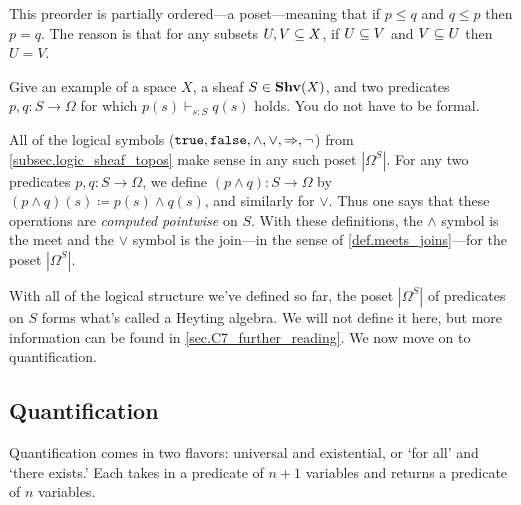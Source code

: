 \documentclass[7Sketches]{subfiles}
\begin{document}
This preorder is partially ordered---a poset---meaning that if $p\leq q$ and $q\leq p$ then $p=q$. The reason is that for any subsets $U,V\ss X$, if $U\ss V$ and $V\ss U$ then $U=V$.

\begin{exercise}%
\label{exc.vdash}
Give an example of a space $X$, a sheaf $S\in\Shv(X)$, and two predicates $p,q\colon S\to\Omega$ for which $p(s)\vdash_{s:S} q(s)$ holds. You do not have to be formal.
\end{exercise}

All of the logical symbols ($\true,\false,\wedge,\vee,\imp,\neg$) from
\cref{subsec.logic_sheaf_topos} make sense in any such poset $|\Omega^S|$. For
any two predicates $p,q\colon S\to\Omega$, we define $(p\wedge q)\colon
S\to\Omega$ by $(p\wedge q)(s)\coloneqq p(s)\wedge q(s)$, and similarly for
$\vee$. Thus one says that these operations are \emph{computed pointwise} on
$S$. With these definitions, the $\wedge$ symbol is the meet and the $\vee$
symbol is the join---in the sense of \cref{def.meets_joins}---for the poset
$|\Omega^S|$.

With all of the logical structure we've defined so far, the poset $|\Omega^S|$ of predicates on $S$ forms what's called a Heyting algebra. We will not define it here, but more information can be found in \cref{sec.C7_further_reading}. We now move on to quantification.

\subsection{Quantification}%
\label{subsec.quantification}
%

Quantification comes in two flavors: universal and existential, or `for all' and `there exists.' Each takes in a predicate of $n+1$ variables and returns a predicate of $n$ variables.
\end{document}
